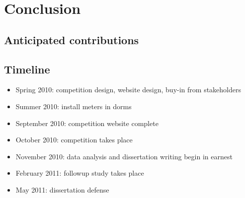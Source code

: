 \chapter{Conclusion}


\section{Anticipated contributions}

\section{Timeline}

\begin{itemize}
\item Spring 2010: competition design, website design, buy-in from stakeholders
\item Summer 2010: install meters in dorms
\item September 2010: competition website complete
\item October 2010: competition takes place
\item November 2010: data analysis and dissertation writing begin in earnest
\item February 2011: followup study takes place
\item May 2011: dissertation defense
\end{itemize}
